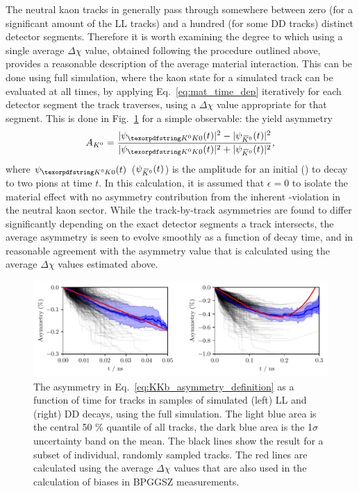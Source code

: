The neutral kaon tracks in \lhcb generally pass through somewhere between zero (for a significant amount of the LL tracks) and a hundred (for some DD tracks) distinct detector segments. Therefore it is worth examining the degree to which using a single average $\Delta\chi$ value, obtained following the procedure outlined above, provides a reasonable description of the average material interaction. This can be done using full \lhcb simulation, where the kaon state for a simulated track can be evaluated at all times, by applying Eq.~\eqref{eq:mat_time_dep} iteratively for each detector segment the track traverses, using a $\Delta\chi$ value appropriate for that segment. 
This is done in Fig.~\ref{fig:lhcb_asymmetry} for a simple observable: the yield asymmetry 
\begin{align}\label{eq:KKb_asymmetry_definition}
    A_{K^0} = \frac{|\psi_{\Kz}(t)|^2 - |\psi_\Kzb(t)|^2}{|\psi_{\Kz}(t)|^2 + |\psi_\Kzb(t)|^2},
\end{align}
where $\psi_{\Kz}(t)$ ($\psi_{{\kern 0.18em\overline{\kern -0.18em K}}{}^0}(t)$) is the amplitude for an initial \Kz (\Kzb) to decay to two pions at time $t$. In this calculation, it is assumed that $\epsilon=0$ to isolate the material effect with no asymmetry contribution from the inherent \CP-violation in the neutral kaon sector. While the track-by-track asymmetries are found to differ significantly depending on the exact detector segments a track intersects, the average asymmetry is seen to evolve smoothly as a function of decay time, and in reasonable agreement with the asymmetry value that is calculated using the average $\Delta\chi$ values estimated above. 


\begin{figure}[tb]
    \centering
    \includegraphics[width=\columnwidth]{figures/analysis/systematics/compare_material_int_asym.pdf}
    \caption{The asymmetry in Eq.~\eqref{eq:KKb_asymmetry_definition} as a function of time for \KS tracks in samples of simulated (left) LL and (right) DD decays, using the full \lhcb simulation. The light blue area is the central 50 \% quantile of all tracks, the dark blue area is the 1$\sigma$ uncertainty band on the mean. The black lines show the result for a subset of individual, randomly sampled tracks. The red lines are calculated using the average $\Delta\chi$ values that are also used in the calculation of biases in BPGGSZ measurements.}
    \label{fig:lhcb_asymmetry}
\end{figure}



